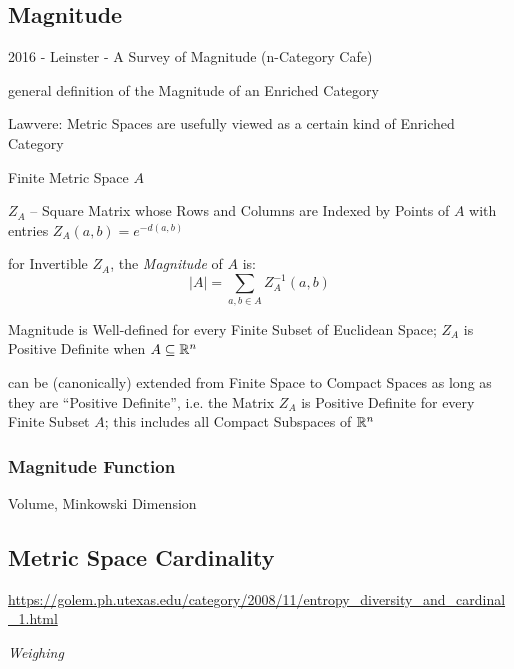 \subsection{Magnitude}\label{sec:magnitude}

2016 - Leinster - A Survey of Magnitude (n-Category Cafe) %

general definition of the Magnitude of an Enriched Category %

Lawvere: Metric Spaces are usefully viewed as a certain kind of
Enriched Category

Finite Metric Space $A$

$Z_A$ -- Square Matrix whose Rows and Columns are Indexed by Points of
$A$ with entries $Z_A(a,b) = e^{-d(a,b)}$

for Invertible $Z_A$, the \emph{Magnitude} of $A$ is:
\[
  |A| = \sum_{a,b \in A} Z^{-1}_A (a,b)
\]

Magnitude is Well-defined for every Finite Subset of Euclidean Space;
$Z_A$ is Positive Definite when $A \subseteq \mathbb{R}^n$

can be (canonically) extended from Finite Space to Compact Spaces as
long as they are ``Positive Definite'', i.e. the Matrix $Z_A$ is
Positive Definite for every Finite Subset $A$; this includes all
Compact Subspaces of $\mathbb{R}^n$



\subsubsection{Magnitude Function}\label{sec:magnitude_function}

Volume, Minkowski Dimension



\subsection{Metric Space Cardinality}\label{sec:metric_cardinality}

\url{https://golem.ph.utexas.edu/category/2008/11/entropy_diversity_and_cardinal_1.html}

\emph{Weighing}



